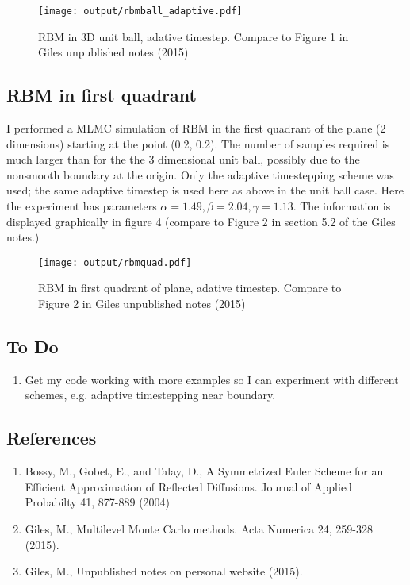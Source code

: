 \documentclass[]{article}
\theoremstyle{definition}
\theoremstyle{remark}
\begin{document}
\begin{figure}[ht!]
\centering
\texttt{[image: output/rbmball\_adaptive.pdf]}
\caption{RBM in 3D unit ball, adative timestep. Compare to Figure 1 in Giles unpublished notes (2015)}
\end{figure}

\subsection{RBM in first quadrant}
I performed a MLMC simulation of RBM in the first quadrant of the plane (2 dimensions) starting at the point (0.2, 0.2). The number of samples required is much larger than for the the 3 dimensional unit ball, possibly due to the nonsmooth boundary at the origin. Only the adaptive timestepping scheme was used; the same adaptive timestep is used here as above in the unit ball case. Here the experiment has parameters $\alpha = 1.49, \beta = 2.04, \gamma = 1.13$. The information is displayed graphically in figure 4 (compare to Figure 2 in section 5.2 of the Giles notes.)

\begin{figure}[ht!]
\centering
\texttt{[image: output/rbmquad.pdf]}
\caption{RBM in first quadrant of plane, adative timestep. Compare to Figure 2 in Giles unpublished notes (2015)}
\end{figure}

\subsection*{To Do}
\begin{enumerate}
\item Get my code working with more examples so I can experiment with different schemes, e.g. adaptive timestepping near boundary.
\end{enumerate}

\subsection*{References}
\begin{enumerate}
\item Bossy, M., Gobet, E., and Talay, D., A Symmetrized Euler Scheme for an Efficient Approximation of Reflected Diffusions. Journal of Applied Probabilty 41, 877-889 (2004) 
\item Giles, M., Multilevel Monte Carlo methods. Acta Numerica 24, 259-328 (2015).
\item Giles, M., Unpublished notes on personal website (2015).
\end{enumerate}
\end{document}
